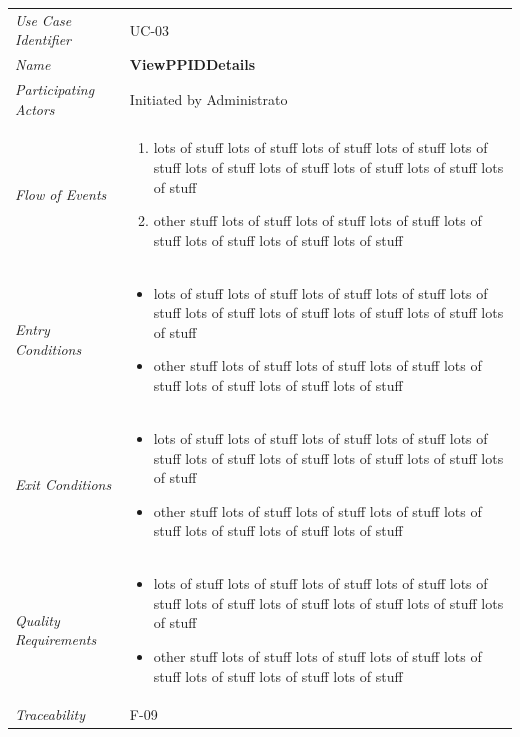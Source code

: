 \documentclass[12pt,letterpaper]{article}
\begin{document}
\begin{center}
	\begin{tabu} to 
		\toprule
		Use Case Identifier & UC-03 \\
		Name & {\bf ViewPPIDDetails} \\
		Participating Actors & Initiated by Administrato \\
		Flow of Events & 
	    \begin{enumerate}[topsep=-1em]
		    \item lots of stuff lots of stuff lots of stuff lots of stuff lots of stuff lots of stuff lots of stuff lots of stuff lots of stuff lots of stuff
		    \item other stuff lots of stuff lots of stuff lots of stuff lots of stuff lots of stuff lots of stuff lots of stuff
		\end{enumerate} \\

		Entry Conditions &
		\begin{itemize}[topsep=-1em]
		    \item lots of stuff lots of stuff lots of stuff lots of stuff lots of stuff lots of stuff lots of stuff lots of stuff lots of stuff lots of stuff
		    \item other stuff lots of stuff lots of stuff lots of stuff lots of stuff lots of stuff lots of stuff lots of stuff
        \end{itemize} \\

		Exit Conditions &
		\begin{itemize}[topsep=-1em]
		    \item lots of stuff lots of stuff lots of stuff lots of stuff lots of stuff lots of stuff lots of stuff lots of stuff lots of stuff lots of stuff
		    \item other stuff lots of stuff lots of stuff lots of stuff lots of stuff lots of stuff lots of stuff lots of stuff
        \end{itemize} \\

		Quality Requirements &
		\begin{itemize}[topsep=-1em]
		    \item lots of stuff lots of stuff lots of stuff lots of stuff lots of stuff lots of stuff lots of stuff lots of stuff lots of stuff lots of stuff
		    \item other stuff lots of stuff lots of stuff lots of stuff lots of stuff lots of stuff lots of stuff lots of stuff
        \end{itemize} \\

		Traceability & F-09 \\
		\toprule
	\end{tabu}
\end{center}
\end{document}
